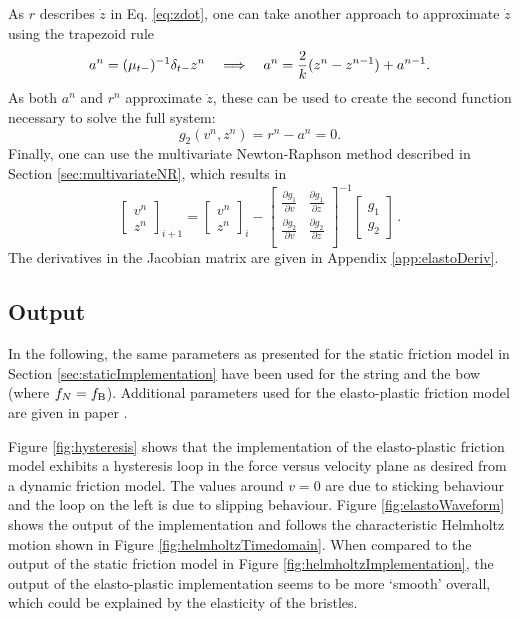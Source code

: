 As $r$ describes $\dot z$ in Eq. \eqref{eq:zdot}, one can take another approach to approximate $\dot z$ using the trapezoid rule \cite{theBible}
\begin{equation}
    a^n = (\mu_{t-})^{-1}\delta_{t-} z^n \quad \Longrightarrow\quad a^n = \frac{2}{k}(z^n - z^{n-1}) + a^{n-1}.
\end{equation}
As both $a^n$ and $r^n$ approximate $\dot z$, these can be used to create the second function necessary to solve the full system:
\begin{equation}\label{eq:elastog2}
    g_2(v^n, z^n) = r^n - a^n = 0.
\end{equation}
Finally, one can use the multivariate Newton-Raphson method described in Section \ref{sec:multivariateNR}, which results in
\begin{equation}\label{eq:NRit}
    \begin{bmatrix}
    v^n\\
    z^n
    \end{bmatrix}_{i+1}
    =
    \begin{bmatrix}
    v^n\\
    z^n
    \end{bmatrix}_i
    -
    \begin{bmatrix}
    \frac{\partial g_1}{\partial v} & \frac{\partial g_1}{\partial z}\\
    \frac{\partial g_2}{\partial v} & \frac{\partial g_2}{\partial z}\\
    \end{bmatrix}^{-1}
    \begin{bmatrix}
    g_1\\
    g_2
    \end{bmatrix}\,
    .
\end{equation}
The derivatives in the Jacobian matrix are given in Appendix \ref{app:elastoDeriv}.

\subsection{Output}
In the following, the same parameters as presented for the static friction model in Section \ref{sec:staticImplementation} have been used for the string and the bow (where $f_N = f_{\text{B}}$).
Additional parameters used for the elasto-plastic friction model are given in paper \citeP[C].

Figure \ref{fig:hysteresis} shows that the implementation of the elasto-plastic friction model exhibits a hysteresis loop in the force versus velocity plane as desired from a dynamic friction model. The values around $v=0$ are due to sticking behaviour and the loop on the left is due to slipping behaviour.
Figure \ref{fig:elastoWaveform} shows the output of the implementation and follows the characteristic Helmholtz motion shown in Figure 
\ref{fig:helmholtzTimedomain}. When compared to the output of the static friction model in Figure \ref{fig:helmholtzImplementation}, the output of the elasto-plastic implementation seems to be more `smooth' overall, which could be explained by the elasticity of the bristles. 

